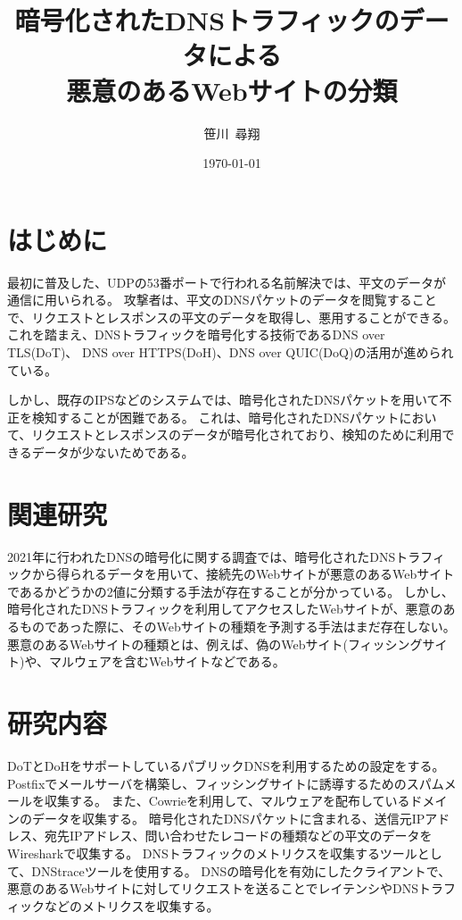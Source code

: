 \documentclass[twocolumn,article]{jlreq}
\title{暗号化されたDNSトラフィックのデータによる\\悪意のあるWebサイトの分類}
\author{笹川~尋翔}
\date{\today}
\begin{document}
\maketitle

\section{はじめに}\label{sec:intro}
最初に普及した、UDPの53番ポートで行われる名前解決では、平文のデータが通信に用いられる。
攻撃者は、平文のDNSパケットのデータを閲覧することで、リクエストとレスポンスの平文のデータを取得し、悪用することができる。
これを踏まえ、DNSトラフィックを暗号化する技術であるDNS over TLS(DoT)、 DNS over HTTPS(DoH)、DNS over QUIC(DoQ)の活用が進められている。

しかし、既存のIPSなどのシステムでは、暗号化されたDNSパケットを用いて不正を検知することが困難である。
これは、暗号化されたDNSパケットにおいて、リクエストとレスポンスのデータが暗号化されており、検知のために利用できるデータが少ないためである。

\section{関連研究}\label{sec:relation}
2021年に行われたDNSの暗号化に関する調査\theendnotes[1]{}では、暗号化されたDNSトラフィックから得られるデータを用いて、接続先のWebサイトが悪意のあるWebサイトであるかどうかの2値に分類する手法が存在することが分かっている。
しかし、暗号化されたDNSトラフィックを利用してアクセスしたWebサイトが、悪意のあるものであった際に、そのWebサイトの種類を予測する手法はまだ存在しない。
悪意のあるWebサイトの種類とは、例えば、偽のWebサイト(フィッシングサイト)や、マルウェアを含むWebサイトなどである。

\section{研究内容}
DoTとDoHをサポートしているパブリックDNSを利用するための設定をする。
Postfixでメールサーバを構築し、フィッシングサイトに誘導するためのスパムメールを収集する。
また、Cowrieを利用して、マルウェアを配布しているドメインのデータを収集する。
暗号化されたDNSパケットに含まれる、送信元IPアドレス、宛先IPアドレス、問い合わせたレコードの種類などの平文のデータをWiresharkで収集する。
DNSトラフィックのメトリクスを収集するツールとして、DNStrace\theendnotes[2]{}ツールを使用する。
DNSの暗号化を有効にしたクライアントで、悪意のあるWebサイトに対してリクエストを送ることでレイテンシやDNSトラフィックなどのメトリクスを収集する。
\end{document}

